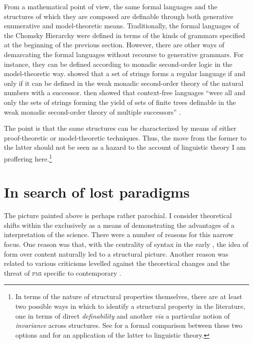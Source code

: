 \documentclass[output=paper]{langscibook}
\begin{document}
From a mathematical point of view, the same formal languages and the structures of which they are composed are definable through both generative enumerative and model-theoretic means. Traditionally, the formal languages of the Chomsky Hierarchy were defined in terms of the kinds of grammars specified at the beginning of the previous section. However, there are other ways of demarcating the formal languages without recourse to generative grammars. For instance, they can be defined according to monadic second-order logic in the model-theoretic way. \cite{Buchi1960} showed that a set of strings forms a regular language if and only if it can be defined in the weak monadic second-order theory of the natural numbers with a successor. \cite{Thatcher1968} then showed that context-free languages ``were all and only the sets of strings forming the yield of sets of finite trees definable in the weak monadic second-order theory of multiple successors'' \citep[1117]{Rogers1998b}.

The point is that the same structures can be characterized by means of either proof-theoretic or model-theoretic techniques. Thus, the move from the former to the latter should not be seen as a hazard to the  account of linguistic theory I am proffering here.\footnote{In terms of the nature of structural properties themselves, there are at least two possible ways in which to identify a structural property in the literature, one in terms of direct \textit{definability} and another \emph{via} a particular notion of \textit{invariance} across structures. See \cite{Korbmacher2017} for a formal comparison between these two options and \cite{Johnson2015} for an application of the latter to linguistic theory.} 

\section{In search of lost paradigms}
\label{sec:nefdt:lostparadigms}

The picture painted above is perhaps rather parochial. I consider theoretical shifts within the  exclusively as a means of demonstrating the advantages of a  interpretation of the science. There were a number of reasons for this narrow focus. One reason was that, with the centrality of syntax in the early , the idea of form over content naturally led to a structural picture. Another reason was related to various criticisms levelled against the theoretical changes and the threat of \textsc{pmi} specific to contemporary . 
\end{document}
